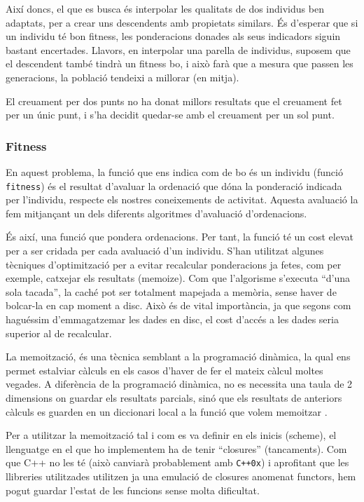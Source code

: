 Així doncs, el que es busca és interpolar les qualitats de dos individus ben
adaptats, per a crear uns descendents amb propietats similars.  És d'esperar que
si un individu té bon fitness, les ponderacions donades als seus indicadors
siguin bastant encertades.  Llavors, en interpolar una parella de individus,
suposem que el descendent també tindrà un fitness bo, i això farà que a mesura
que passen les generacions, la població tendeixi a millorar (en mitja).

El creuament per dos punts no ha donat millors resultats que el creuament fet
per un únic punt, i s'ha decidit quedar-se amb el creuament per un sol punt.

\subsubsection{Fitness} %
\label{ssub:PFitness}
En aquest problema, la funció que ens indica com de bo és un individu (funció
\texttt{fitness}) és el resultat d'avaluar la ordenació que dóna la ponderació
indicada per l'individu, respecte els nostres coneixements de activitat. Aquesta
avaluació la fem mitjançant un dels diferents algoritmes d'avaluació d'ordenacions.


És així, una funció que pondera ordenacions.  Per tant, la funció té un cost
elevat per a ser cridada per cada avaluació d'un individu.  S'han utilitzat
algunes tècniques d'optimització per a evitar recalcular ponderacions ja fetes,
com per exemple, catxejar els resultats (memoize).  Com que l'algorisme
s'executa ``d'una sola tacada'', la caché pot ser totalment mapejada a memòria,
sense haver de bolcar-la en cap moment a disc.  Això és de vital importància, ja
que segons com haguéssim d'emmagatzemar les dades en disc, el cost d'accés a les
dades seria superior al de recalcular. 

La memoització, és una tècnica semblant a la programació dinàmica, la qual ens
permet estalviar càlculs en els casos d'haver de fer el mateix càlcul moltes
vegades.  A diferència de la programació dinàmica, no es necessita una taula de
2 dimensions on guardar els resultats parcials, sinó que els resultats de
anteriors càlculs es guarden en un diccionari local a la funció que volem
memoitzar \cite{MJD05}. 

Per a utilitzar la memoització tal i com es va definir en els inicis
(scheme), el llenguatge en el que ho implementem ha de tenir ``closures''
(tancaments).  Com que C++ no les té (això canviarà probablement amb
\texttt{C++0x}) %
i aprofitant que les llibreries utilitzades utilitzen ja una emulació de
closures anomenat functors, hem pogut guardar l'estat de les funcions sense
molta dificultat. 

